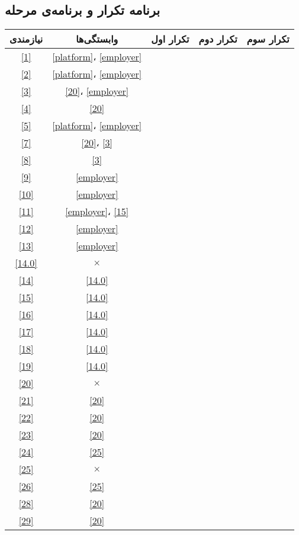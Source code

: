\documentclass[12pt]{book}
\begin{document}
	\subsection{برنامه تکرار و برنامه‌ی مرحله}
	\begin{center}
		\begin{longtable}{|c|c|c|c|c|}
			\hline
			نیازمندی & وابستگی‌ها & تکرار اول & تکرار دوم & تکرار سوم \\
			\hline
			\hline
			\ref{1} & \ref{platform}، \ref{employer} & & & \\ \hline
			\ref{2} & \ref{platform}، \ref{employer} & \checkmark & & \\ \hline
			\ref{3} & \ref{20}، \ref{employer} & \checkmark & & \\ \hline
			\ref{4} & \ref{20} & \checkmark & & \\ \hline
			\ref{5} & \ref{platform}، \ref{employer} & \checkmark & & \\ \hline
			\ref{7} & \ref{20}، \ref{3} & & & \\ \hline
			\ref{8} & \ref{3} & \checkmark & & \\ \hline
			\ref{9} & \ref{employer} & \checkmark & & \\ \hline
			\ref{10} & \ref{employer} & \checkmark & & \\ \hline
			\ref{11} & \ref{employer}، \ref{15} & \checkmark & & \\ \hline
			\ref{12} & \ref{employer} & & & \\ \hline
			\ref{13} & \ref{employer} & \checkmark & & \\ \hline
			
			\ref{14.0} & $\times$ & \checkmark & & \\ \hline
			\ref{14} & \ref{14.0} & \checkmark & & \\ \hline
			\ref{15} & \ref{14.0} & \checkmark & & \\ \hline
			\ref{16} & \ref{14.0} & \checkmark & & \\ \hline
			\ref{17} & \ref{14.0} & \checkmark & & \\ \hline
			\ref{18} & \ref{14.0} & \checkmark & & \\ \hline
			\ref{19} & \ref{14.0} & \checkmark & & \\ \hline
			
			\ref{20} & $\times$ & \checkmark & & \\ \hline
			\ref{21} & \ref{20} & \checkmark & & \\ \hline
			\ref{22} & \ref{20} & \checkmark & & \\ \hline
			\ref{23} & \ref{20} & \checkmark & & \\ \hline
			\ref{24} & \ref{25} & \checkmark & & \\ \hline
			\ref{25} & $\times$ & \checkmark & & \\ \hline
			\ref{26} & \ref{25} & \checkmark & & \\ \hline
			\ref{28} & \ref{20} & \checkmark & & \\ \hline
			\ref{29} & \ref{20} & \checkmark & & \\ \hline
		\end{longtable}
	\end{center}
	
	
\end{document}
